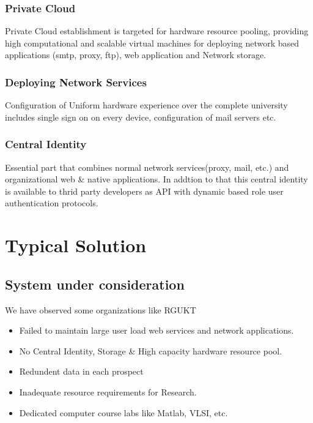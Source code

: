 \documentclass[12pt]{report}
\begin{document}
\subsection{Private Cloud}

	Private Cloud establishment is targeted for hardware resource pooling, providing high computational and scalable virtual machines for deploying network based applications (smtp, proxy, ftp), web application and Network storage.
	
\subsection{Deploying Network Services}

	Configuration of Uniform hardware experience over the complete university includes single sign on on every device, configuration of mail servers etc.
	
\subsection{Central Identity}

	Essential part that combines normal network services(proxy, mail, etc.) and organizational web \& native applications. In addtion to that this central identity is available to thrid party developers as API with dynamic based role user authentication protocols.	
	

\chapter{Typical Solution}

\section{System under consideration}

	We have observed some organizations like RGUKT  
	\begin{itemize}
		\item Failed to maintain large user load web services  and network applications.
		\item No Central Identity, Storage \& High capacity hardware resource pool.
		\item Redundent data in each prospect
		\item Inadequate resource requirements for Research.
		\item Dedicated computer course labs like Matlab, VLSI, etc. 
	\end{itemize}
\end{document}
